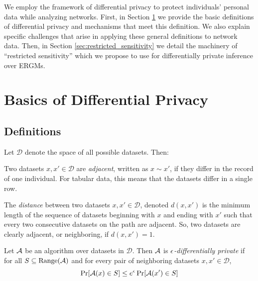We employ the framework of differential privacy to protect individuals' personal data while analyzing networks.  First, in Section \ref{sec:basics} we provide the basic definitions of differential privacy and mechanisms that meet this definition. We also explain specific challenges that arise in applying these general definitions to network data. Then, in Section \ref{sec:restricted_sensitivity} we detail the machinery of ``restricted sensitivity'' which we propose to use for differentially private inference over ERGMs.

\section{Basics of Differential Privacy}\label{sec:basics}

\subsection*{Definitions}

Let $\mathcal{D}$ denote the space of all possible datasets. Then:

\begin{definition}
\label{def:neighbors}
Two datasets $x, x' \in \mathcal{D}$ are \emph{adjacent}, written as $x \sim x'$, if 
they differ in the record of one individual. For tabular data, this means that the datasets differ in a single row. 
\end{definition}

\begin{definition}
	\label{def:distance}
	The \emph{distance} between two datasets $x, x' \in \mathcal{D}$, denoted $d(x, x')$ is the minimum length of the sequence of datasets beginning with $x$ and ending with $x'$ such that every two consecutive datasets on the path are adjacent. So, two datasets are clearly adjacent, or neighboring, if $d(x, x') = 1$. 
\end{definition}

\begin{definition} Let $\mathcal{A}$ be an algorithm over datasets in $\mathcal{D}$. Then $\mathcal{A}$ is \emph{$\epsilon$-differentially private} if for all $S \subseteq \text{Range}(\mathcal{A})$ and for every pair of neighboring datasets $x, x' \in \mathcal{D}$,
	\begin{equation*}
	\Pr[\mathcal{A}(x) \in S] \leq e^{\epsilon} \Pr[\mathcal{A}(x') \in S]
	\end{equation*}
\end{definition}

